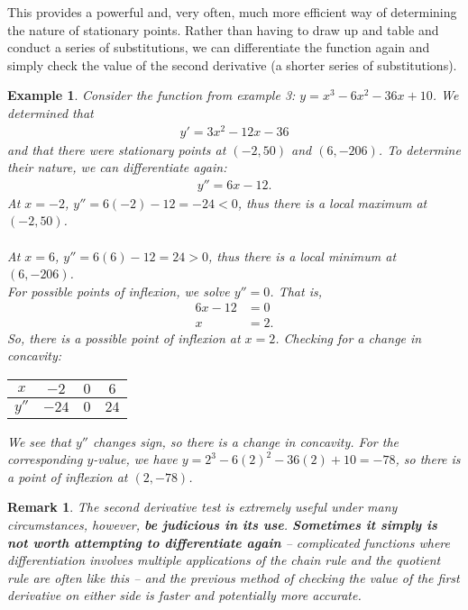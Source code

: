 \documentclass[a4paper,11pt]{article}
\newtheorem{example}{Example}
\newtheorem*{remark}{Remark}
\begin{document}
\noindent This provides a powerful and, very often, much more efficient way of determining the nature of stationary points. Rather than having to draw up and table and conduct a series of substitutions, we can differentiate the function again and simply check the value of the second derivative (a shorter series of substitutions). 

\begin{example}\normalfont
	Consider the function from example 3: $y=x^3-6x^2-36x+10$. We determined that
	\begin{align*}
		y' = 3x^2-12x-36
	\end{align*}
	and that there were stationary points at $(-2,50)$ and $(6,-206)$. To determine their nature, we can differentiate again:
	\begin{align*}
		y'' = 6x-12.
	\end{align*}
	At $x=-2$, $y''=6(-2)-12=-24<0$, thus there is a local maximum at $(-2,50)$.\\\\
	At $x=6$, $y''=6(6)-12 = 24>0$, thus there is a local minimum at $(6,-206)$.\\
	
	\noindent For possible points of inflexion, we solve $y''=0$. That is,
	\begin{align*}
		6x-12 &= 0\\
		x&=2.
	\end{align*}
	So, there is a possible point of inflexion at $x=2$. Checking for a change in concavity:
	{\renewcommand{\arraystretch}{1.5}%
		\begin{table}[H]\centering
			\begin{tabular}{c|c|c|c}
				 $x$  & $-2$  & $0$ & $6$  \\ \hline
				$y''$ & $-24$ & $0$ & $24$
			\end{tabular}
	\end{table}}
	\noindent We see that $y''$ changes sign, so there is a change in concavity. For the corresponding $y$-value, we have $y=2^3-6(2)^2-36(2)+10=-78$, so there is a point of inflexion at $(2,-78)$.
\end{example}

\begin{remark}\normalfont
The second derivative test is extremely useful under many circumstances, however, \textbf{be judicious in its use}. \textbf{Sometimes it simply is not worth attempting to differentiate again} -- complicated functions where differentiation involves multiple applications of the chain rule and the quotient rule are often like this -- and the previous method of checking the value of the first derivative on either side is faster and potentially more accurate.
\end{remark}
\end{document}
